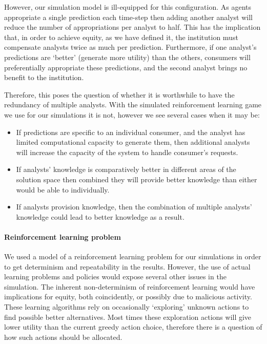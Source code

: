 However, our simulation model is ill-equipped for this configuration. As
agents appropriate a single prediction each time-step then adding another
analyst will reduce the number of appropriations per analyst to half. This has
the implication that, in order to achieve equity, as we have defined it, the
institution must compensate analysts twice as much per prediction.
Furthermore, if one analyst's predictions are `better' (\ie generate more
utility) than the others, consumers will preferentially appropriate these
predictions, and the second analyst brings no benefit to the institution.

Therefore, this poses the question of whether it is worthwhile to have the
redundancy of multiple analysts. With the simulated reinforcement learning
game we use for our simulations it is not, however we see several cases when
it may be:

\begin{itemize}
\item If predictions are specific to an individual consumer, and the analyst has limited computational capacity to generate them, then additional analysts will increase the capacity of the system to handle consumer's requests.
\item If analysts' knowledge is comparatively better in different areas of the solution space then combined they will provide better knowledge than either would be able to individually.
\item If analysts provision knowledge, then the combination of multiple analysts' knowledge could lead to better knowledge as a result. 
\end{itemize}

\paragraph{Reinforcement learning problem} We used a model of a reinforcement
learning problem for our simulations in order to get determinism and
repeatability in the results. However, the use of actual learning problems and
policies would expose several other issues in the simulation. The inherent
non-determinism of reinforcement learning would have implications for equity,
both coincidently, or possibly due to malicious activity. These learning
algorithms rely on occasionally `exploring' unknown actions to find possible
better alternatives. Most times these exploration actions will give lower
utility than the current greedy action choice, therefore there is a question
of how such actions should be allocated.

